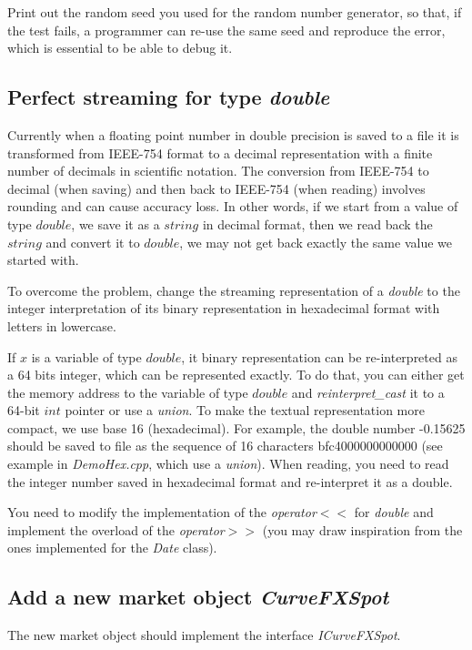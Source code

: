 \documentclass[10pt]{article}
\begin{document}
Print out the random seed you used for the random number generator, so that, if the test fails, a programmer can re-use the same seed and reproduce the error, which is essential to be able to debug it.

\subsection{Perfect streaming for type \textit{double}}
Currently when a floating point number in double precision is saved to a file it is transformed from IEEE-754 format to a decimal representation with a finite number of decimals in scientific notation. The conversion from IEEE-754 to decimal (when saving) and then back to IEEE-754 (when reading) involves rounding and can cause accuracy loss. In other words, if we start from a value of type $double$, we save it as a $string$ in decimal format, then we read back the $string$ and convert it to $double$, we may not get back exactly the same value we started with.

To overcome the problem, change the streaming representation of a \textit{double} to the integer interpretation of its binary representation in hexadecimal format with letters in lowercase.

If $x$ is a variable of type $double$, it binary representation can be re-interpreted as a 64 bits integer, which can be represented exactly. To do that,
you can either get the memory address to the variable of type $double$ and \textit{reinterpret\_cast} it to a 64-bit $int$ pointer or use a \textit{union}. To make the textual representation more compact, we use base 16 (hexadecimal). For example, the double number -0.15625 should be saved to file as the sequence of 16 characters bfc4000000000000 (see example in \textit{DemoHex.cpp}, which use a \textit{union}). When reading, you need to read the integer number saved in hexadecimal format and re-interpret it as a double.

You need to modify the implementation of the \textit{operator$<<$} for \textit{double} and implement the overload of the \textit{operator$>>$} (you may draw inspiration from the ones implemented for the \textit{Date} class).

\subsection{Add a new market object \textit{CurveFXSpot}}
The new market object should implement the interface \textit{ICurveFXSpot}.
\end{document}
